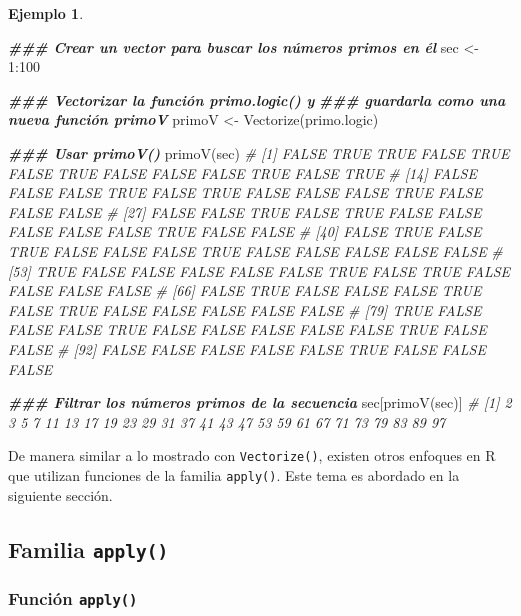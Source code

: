 \documentclass[
]{article}
\newenvironment{Shaded}{\begin{snugshade}}{\end{snugshade}}
\newcommand{\CommentTok}[1]{\textcolor[rgb]{0.56,0.35,0.01}{\textit{#1}}}
\newcommand{\DecValTok}[1]{\textcolor[rgb]{0.00,0.00,0.81}{#1}}
\newcommand{\DocumentationTok}[1]{\textcolor[rgb]{0.56,0.35,0.01}{\textbf{\textit{#1}}}}
\newcommand{\FunctionTok}[1]{\textcolor[rgb]{0.00,0.00,0.00}{#1}}
\newcommand{\NormalTok}[1]{#1}
\newcommand{\OtherTok}[1]{\textcolor[rgb]{0.56,0.35,0.01}{#1}}
\newcommand{\SpecialCharTok}[1]{\textcolor[rgb]{0.00,0.00,0.00}{#1}}
\theoremstyle{definition}
\theoremstyle{definition}
\newtheorem{example}{Ejemplo}[section]
\theoremstyle{definition}
\theoremstyle{definition}
\theoremstyle{remark}
\begin{document}
\begin{example}
\begin{Shaded}
\begin{Highlighting}[]
\DocumentationTok{\#\#\# Crear un vector para buscar los números primos en él}
\NormalTok{sec }\OtherTok{\textless{}{-}} \DecValTok{1}\SpecialCharTok{:}\DecValTok{100}

\DocumentationTok{\#\#\# Vectorizar la función primo.logic() y }
\DocumentationTok{\#\#\# guardarla como una nueva función primoV}
\NormalTok{primoV }\OtherTok{\textless{}{-}} \FunctionTok{Vectorize}\NormalTok{(primo.logic) }

\DocumentationTok{\#\#\# Usar primoV()}
\FunctionTok{primoV}\NormalTok{(sec)}
\CommentTok{\#   [1] FALSE  TRUE  TRUE FALSE  TRUE FALSE  TRUE FALSE FALSE FALSE  TRUE FALSE  TRUE}
\CommentTok{\#  [14] FALSE FALSE FALSE  TRUE FALSE  TRUE FALSE FALSE FALSE  TRUE FALSE FALSE FALSE}
\CommentTok{\#  [27] FALSE FALSE  TRUE FALSE  TRUE FALSE FALSE FALSE FALSE FALSE  TRUE FALSE FALSE}
\CommentTok{\#  [40] FALSE  TRUE FALSE  TRUE FALSE FALSE FALSE  TRUE FALSE FALSE FALSE FALSE FALSE}
\CommentTok{\#  [53]  TRUE FALSE FALSE FALSE FALSE FALSE  TRUE FALSE  TRUE FALSE FALSE FALSE FALSE}
\CommentTok{\#  [66] FALSE  TRUE FALSE FALSE FALSE  TRUE FALSE  TRUE FALSE FALSE FALSE FALSE FALSE}
\CommentTok{\#  [79]  TRUE FALSE FALSE FALSE  TRUE FALSE FALSE FALSE FALSE FALSE  TRUE FALSE FALSE}
\CommentTok{\#  [92] FALSE FALSE FALSE FALSE FALSE  TRUE FALSE FALSE FALSE}

\DocumentationTok{\#\#\# Filtrar los números primos de la secuencia}
\NormalTok{sec[}\FunctionTok{primoV}\NormalTok{(sec)]}
\CommentTok{\#  [1]  2  3  5  7 11 13 17 19 23 29 31 37 41 43 47 53 59 61 67 71 73 79 83 89 97}
\end{Highlighting}
\end{Shaded}

\end{example}

De manera similar a lo mostrado con \texttt{Vectorize()}, existen otros enfoques en R que utilizan funciones de la familia \texttt{apply()}. Este tema es abordado en la siguiente sección.

\hypertarget{familia-apply}{%
\subsection{\texorpdfstring{Familia \texttt{apply()}}{Familia apply()}}\label{familia-apply}}

\hypertarget{funciuxf3n-apply}{%
\subsubsection{\texorpdfstring{Función \texttt{apply()}}{Función apply()}}\label{funciuxf3n-apply}}
\end{document}
